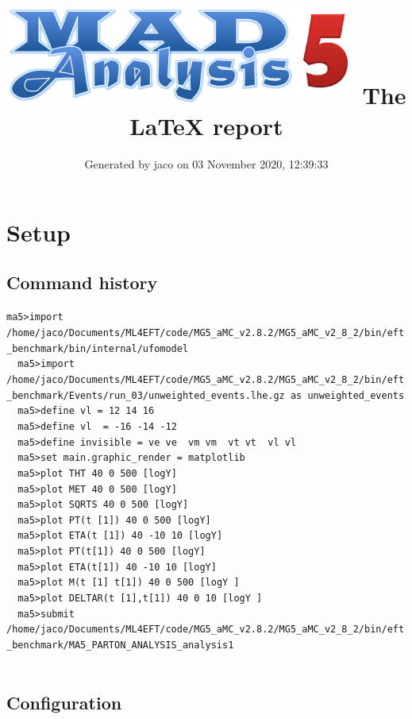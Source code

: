 \documentclass[a4paper, 10pt]{article}
\title{{\includegraphics[scale=.4]{logo.png}}\ The LaTeX report}
\author{Generated by jaco on 03 November 2020, 12:39:33}
\begin{document}
\maketitle
\flushbottom

\newpage
\section{ Setup}

\subsection{ Command history}

\texttt{ma5>import /\-home/\-jaco/\-Documents/\-ML4EFT/\-code/\-MG5\_aMC\_v2.8.2/\-MG5\_aMC\_v2\_8\_2/\-bin/\-eft\_benchmark/\-bin/\-internal/\-ufomodel\\
}
\texttt{ }\texttt{ }\texttt{ma5>import /\-home/\-jaco/\-Documents/\-ML4EFT/\-code/\-MG5\_aMC\_v2.8.2/\-MG5\_aMC\_v2\_8\_2/\-bin/\-eft\_benchmark/\-Events/\-run\_03/\-unweighted\_events.lhe.gz as unweighted\_events\\
}
\texttt{ }\texttt{ }\texttt{ma5>define vl = 12 14 16\\
}
\texttt{ }\texttt{ }\texttt{ma5>define vl~ = -16 -14 -12\\
}
\texttt{ }\texttt{ }\texttt{ma5>define invisible = ve ve~ vm vm~ vt vt~ vl vl~\\
}
\texttt{ }\texttt{ }\texttt{ma5>set main.graphic\_render = matplotlib\\
}
\texttt{ }\texttt{ }\texttt{ma5>plot THT   40 0 500 [logY]\\
}
\texttt{ }\texttt{ }\texttt{ma5>plot MET   40 0 500 [logY]\\
}
\texttt{ }\texttt{ }\texttt{ma5>plot SQRTS 40 0 500 [logY]\\
}
\texttt{ }\texttt{ }\texttt{ma5>plot  PT(t~[1]) 40 0  500 [logY]\\
}
\texttt{ }\texttt{ }\texttt{ma5>plot ETA(t~[1]) 40 -10 10 [logY]\\
}
\texttt{ }\texttt{ }\texttt{ma5>plot  PT(t[1]) 40 0  500 [logY]\\
}
\texttt{ }\texttt{ }\texttt{ma5>plot ETA(t[1]) 40 -10 10 [logY]\\
}
\texttt{ }\texttt{ }\texttt{ma5>plot M(t~[1] t[1]) 40 0  500 [logY ]\\
}
\texttt{ }\texttt{ }\texttt{ma5>plot DELTAR(t~[1],t[1]) 40 0 10 [logY ]\\
}
\texttt{ }\texttt{ }\texttt{ma5>submit /\-home/\-jaco/\-Documents/\-ML4EFT/\-code/\-MG5\_aMC\_v2.8.2/\-MG5\_aMC\_v2\_8\_2/\-bin/\-eft\_benchmark/\-MA5\_PARTON\_ANALYSIS\_analysis1\\
}
\texttt{ }\texttt{ }\subsection{ Configuration}
\end{document}
